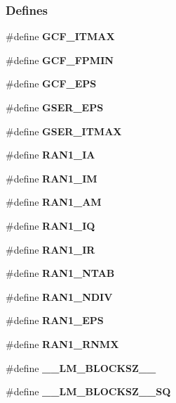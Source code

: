 \subsubsection*{Defines}
\begin{CompactItemize}
\item 
\#define {\bf GCF\_\-ITMAX}
\item 
\#define \textbf{GCF\_\-FPMIN}\label{group__nr_g4d2a5b0ed774d7c6cd7ed3aeede02b32}

\item 
\#define \textbf{GCF\_\-EPS}\label{group__nr_g545baaa7a8baff47a88f64d9e22f85eb}

\item 
\#define \textbf{GSER\_\-EPS}\label{group__nr_g2f99393cf98b977fa0ed7d77df4b1847}

\item 
\#define \textbf{GSER\_\-ITMAX}\label{group__nr_ge81a5f817c0ccb9e9b21d0a93a69f1fb}

\item 
\#define \textbf{RAN1\_\-IA}\label{group__nr_gfac3e13315af7108196380d1e4626fff}

\item 
\#define \textbf{RAN1\_\-IM}\label{group__nr_g1854f35d8460beeacca2f0538495054e}

\item 
\#define \textbf{RAN1\_\-AM}\label{group__nr_ga1f56cea0760315b3d77f8d43c214b9f}

\item 
\#define \textbf{RAN1\_\-IQ}\label{group__nr_g62b55be906a8312d99fa219df59d2603}

\item 
\#define \textbf{RAN1\_\-IR}\label{group__nr_gd9837af690685692ba3b79204aacda7d}

\item 
\#define \textbf{RAN1\_\-NTAB}\label{group__nr_g9ed2ef7c12b486ed6bcaa2f865799f39}

\item 
\#define \textbf{RAN1\_\-NDIV}\label{group__nr_g9e50163471f8a66724a30e90b859683c}

\item 
\#define \textbf{RAN1\_\-EPS}\label{group__nr_ge7332177f9233d665df2bc8b162d2484}

\item 
\#define \textbf{RAN1\_\-RNMX}\label{group__nr_g764a79bfff270bb14a93930e3da5d7cc}

\item 
\#define {\bf \_\-\_\-LM\_\-BLOCKSZ\_\-\_\-}
\item 
\#define \textbf{\_\-\_\-LM\_\-BLOCKSZ\_\-\_\-SQ}\label{group__nr_ge730cf8f762cf844c8a987af6be4bd9c}


\end{CompactItemize}
